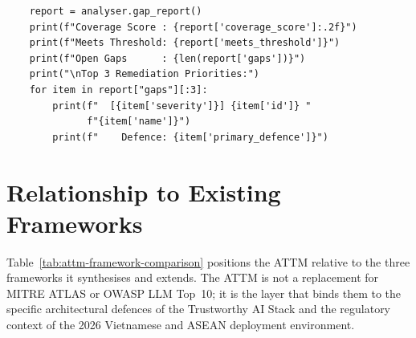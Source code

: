 \begin{lstlisting}
    report = analyser.gap_report()
    print(f"Coverage Score : {report['coverage_score']:.2f}")
    print(f"Meets Threshold: {report['meets_threshold']}")
    print(f"Open Gaps      : {len(report['gaps'])}")
    print("\nTop 3 Remediation Priorities:")
    for item in report["gaps"][:3]:
        print(f"  [{item['severity']}] {item['id']} "
              f"{item['name']}")
        print(f"    Defence: {item['primary_defence']}")
\end{lstlisting}

\section{Relationship to Existing Frameworks}

Table~\ref{tab:attm-framework-comparison} positions the ATTM relative
to the three frameworks it synthesises and extends.  The ATTM is not
a replacement for MITRE ATLAS or OWASP LLM Top~10; it is the
layer that binds them to the specific architectural defences of the
Trustworthy AI Stack and the regulatory context of the 2026
Vietnamese and ASEAN deployment environment.

